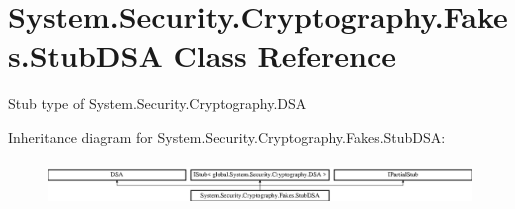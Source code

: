 \hypertarget{class_system_1_1_security_1_1_cryptography_1_1_fakes_1_1_stub_d_s_a}{\section{System.\-Security.\-Cryptography.\-Fakes.\-Stub\-D\-S\-A Class Reference}
\label{class_system_1_1_security_1_1_cryptography_1_1_fakes_1_1_stub_d_s_a}
}


Stub type of System.\-Security.\-Cryptography.\-D\-S\-A 


Inheritance diagram for System.\-Security.\-Cryptography.\-Fakes.\-Stub\-D\-S\-A\-:\begin{figure}[H]
\begin{center}
\leavevmode
\includegraphics[height=1.192758cm]{class_system_1_1_security_1_1_cryptography_1_1_fakes_1_1_stub_d_s_a}
\end{center}
\end{figure}
